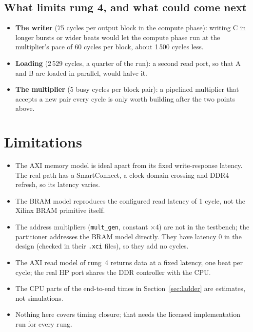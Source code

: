 \documentclass[11pt,a4paper]{article}
\newcommand{\code}[1]{\texttt{#1}}
\begin{document}
\subsection{What limits rung 4, and what could come next}
\begin{itemize}[noitemsep]
  \item \textbf{The writer} (75 cycles per output block in the compute phase): writing C in longer bursts or wider beats would let the compute phase run at the multiplier's pace of 60 cycles per block, about 1\,500 cycles less.
  \item \textbf{Loading} (2\,529 cycles, a quarter of the run): a second read port, so that A and B are loaded in parallel, would halve it.
  \item \textbf{The multiplier} (5 busy cycles per block pair): a pipelined multiplier that accepts a new pair every cycle is only worth building after the two points above.
\end{itemize}

\section{Limitations}
\begin{itemize}[noitemsep]
  \item The AXI memory model is ideal apart from its fixed write-response latency. The real path has a SmartConnect, a clock-domain crossing and DDR4 refresh, so its latency varies.
  \item The BRAM model reproduces the configured read latency of 1 cycle, not the Xilinx BRAM primitive itself.
  \item The address multipliers (\code{mult\_gen}, constant $\times4$) are not in the testbench; the partitioner addresses the BRAM model directly. They have latency 0 in the design (checked in their \code{.xci} files), so they add no cycles.
  \item The AXI read model of rung~4 returns data at a fixed latency, one beat per cycle; the real HP port shares the DDR controller with the CPU.
  \item The CPU parts of the end-to-end times in Section~\ref{sec:ladder} are estimates, not simulations.
  \item Nothing here covers timing closure; that needs the licensed implementation run for every rung.
\end{itemize}
\end{document}
